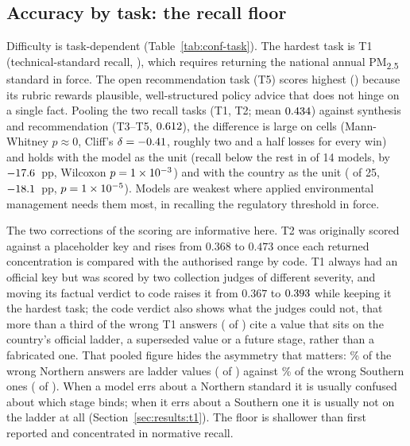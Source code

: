 \begin{table}[h]
\centering
\caption{Composite accuracy by model across 25 countries (factual verdict by
code where the answer is a register value, panel mean elsewhere; $[0,1]$). $N$
= scored English-prompt responses.}
\label{tab:conf-model}
\footnotesize
\setlength{\tabcolsep}{8pt}
\renewcommand{\arraystretch}{1.15}

\end{table}

\subsection{Accuracy by task: the recall floor}
\label{sec:results:task}

Difficulty is task-dependent (Table~\ref{tab:conf-task}). The hardest task is
T1 (technical-standard recall, \ntasktone), which requires returning the
national annual PM\textsubscript{2.5} standard in force. The open
recommendation task (T5) scores highest (\ntasktfive) because its rubric
rewards plausible, well-structured policy advice that does not hinge on a
single fact. Pooling the two recall tasks (T1, T2; mean $0.434$)
against synthesis and recommendation (T3--T5, $0.612$), the difference is
large on cells (Mann-Whitney $p\approx 0$, Cliff's $\delta=-0.41$,
roughly two and a half losses for every win) and holds with the model as the
unit (recall below the rest in \nfloorbymodelneg{} of 14 models, by
$-17.6$~pp, Wilcoxon $p=1\times10^{-3}$) and with the country as the
unit (\nfloorbyctryneg{} of 25, $-18.1$~pp, $p=1\times10^{-5}$).
Models are weakest where applied environmental management needs them most, in
recalling the regulatory threshold in force.

The two corrections of the scoring are informative here. T2 was originally
scored against a placeholder key and rises from $0.368$ to $0.473$ once each
returned concentration is compared with the authorised range by code. T1 always
had an official key but was scored by two collection judges of different
severity, and moving its factual verdict to code raises it from $0.367$ to
$0.393$ while keeping it the hardest task; the code verdict also shows
what the judges could not, that more than a third of the wrong T1 answers
(\nladderhit{} of \nincorrectn) cite a value that sits on the country's
official ladder, a superseded value or a future stage, rather than a fabricated
one. That pooled figure hides the asymmetry that matters: \nladdershgn\% of
the wrong Northern answers are ladder values (\nladderhitgn{} of
\nincorrectgn) against \nladdershgs\% of the wrong Southern ones
(\nladderhitgs{} of \nincorrectgs). When a model errs about a Northern
standard it is usually confused about which stage binds; when it errs about a
Southern one it is usually not on the ladder at all
(Section~\ref{sec:results:t1}). The floor is shallower than first reported and
concentrated in normative recall.

